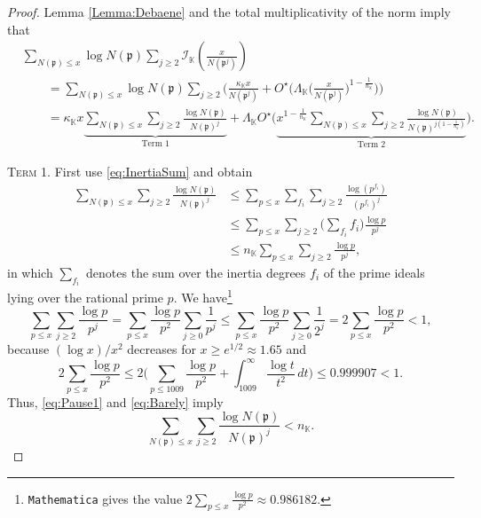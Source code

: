 \documentclass[10pt,reqno]{amsart}
\theoremstyle{plain}
\theoremstyle{definition}
\newcommand{\K}{\mathbb{K}}
\newcommand{\PP}{\mathfrak{p}}
\newcommand{\I}{\mathcal{I}}
\begin{document}
\begin{proof}
Lemma \ref{Lemma:Debaene} and the total multiplicativity of the norm imply that
\begin{align}
&\sum_{N(\PP)\leq x} \log{N(\PP)} \sum_{j\geq 2} \I_{\K} \left(\frac{x}{N(\PP^j)}\right) \label{eq:Quantity}\\
&\qquad= \sum_{N(\PP)\leq x} \log{N(\PP)} \sum_{j\geq 2} \Bigg( \frac{\kappa_{\K} x}{N(\PP^j)} 
+ O^{\star}\bigg( \Lambda_{\K}\bigg(\frac{x}{N(\PP^j)}\bigg)^{1 - \frac{1}{n_{\K}}}  \bigg) \Bigg) \nonumber \\
&\qquad= \kappa_{\K} x  \underbrace{ \sum_{N(\PP)\leq x} \sum_{j\geq 2} \frac{\log{N(\PP)}}{N(\PP)^j}  }_{\text{Term 1}}
+ \Lambda_{\K}  O^{\star} \Bigg(
\underbrace{ x^{1 - \frac{1}{n_{\K}}} \sum_{N(\PP)\leq x}\sum_{j\geq 2} \frac{\log{N(\PP)} }{N(\PP)^{j(1 - \frac{1}{n_{\K}})}}  }_{\text{Term 2}}
 \Bigg) .\label{eq:Terms}
\end{align}

\medskip\noindent\textsc{Term 1.}
First use \eqref{eq:InertiaSum} and obtain
\begin{align}
    \sum_{N(\PP)\leq x} \sum_{j\geq 2} \frac{\log{N(\PP)}}{N(\PP)^j}
    &\leq  \sum_{p\leq x} \sum_{f_i} \sum_{j\geq 2} \frac{\log (p^{f_i})}{(p^{f_i})^j} \nonumber\\
    &\leq  \sum_{p\leq x} \sum_{j\geq 2} \bigg(\sum_{f_i}f_i\bigg) \frac{\log{p}}{p^{j}} \nonumber\\
    &\leq  n_{\K}  \sum_{p\leq x} \sum_{j\geq 2} \frac{\log{p}}{p^{j}}, \label{eq:Pause1}
\end{align}
in which $\sum_{f_i}$ denotes the sum over the inertia degrees $f_i$ of the prime ideals lying over the
rational prime $p$. We have\footnote{\texttt{Mathematica} gives the value
$2 \sum_{p\leq x} \frac{\log{p}}{p^2} \approx 0.986182$.}%
\begin{equation}\label{eq:Barely}
\sum_{p\leq x} \sum_{j\geq 2} \frac{\log{p}}{p^j}
= \sum_{p\leq x} \frac{\log{p}}{p^2}\sum_{j\geq 0}\frac{1}{p^j} 
\leq \sum_{p\leq x} \frac{\log{p}}{p^2}\sum_{j\geq 0}\frac{1}{2^j} 
 =2 \sum_{p\leq x} \frac{\log{p}}{p^2} 
< 1,
\end{equation}
because $(\log x)/x^2$ decreases for $x\geq e^{1/2}\approx 1.65$ and  
\begin{equation*}
2 \sum_{p\leq x} \frac{\log{p}}{p^2} \leq 2\bigg(\sum_{p\leq 1009} \frac{\log p}{p^2} + \int_{1009}^{\infty} \frac{\log t}{t^2}\,dt\bigg) \leq 0.999907 < 1.
\end{equation*}
Thus, \eqref{eq:Pause1} and \eqref{eq:Barely} imply
\begin{equation*}
     \sum_{N(\PP)\leq x} \sum_{j\geq 2} \frac{\log{N(\PP)}}{N(\PP)^j}
    < n_{\K}.
\end{equation*}


\end{proof}
\end{document}
